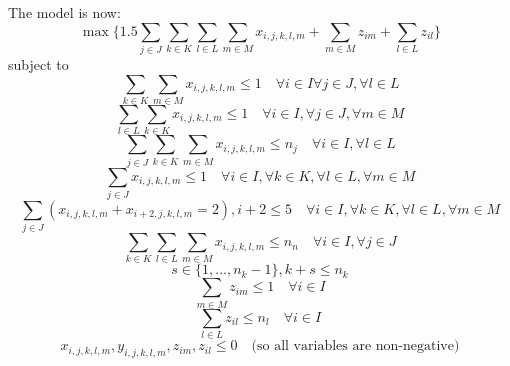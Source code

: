 The model is now:
\begin{equation*}
	\max \{1.5 \sum_{j \in J} \sum_{k \in K} \sum_{l \in L} \sum_{m \in M}
	x_{i,j,k,l,m} + \sum_{m \in M} z_{im} + \sum_{l \in L}z_{il} \}
\end{equation*}
subject to
\begin{equation*}
	\sum_{k \in K} \sum_{m \in M} x_{i,j,k,l,m} \leq 1 \quad \forall i \in I
	\forall j \in J, \forall l \in L
\end{equation*}
\begin{equation*}
	\sum_{l \in L} \sum_{k \in K} x_{i,j,k,l,m} \leq 1 \quad \forall i \in I,
	\forall j \in J, \forall m \in M
\end{equation*}
\begin{equation*}
	\sum_{j \in J} \sum_{k \in K} \sum_{m \in M} x_{i,j,k,l,m} \leq n_j \quad 
	\forall i \in I, \forall l \in L
\end{equation*}
\begin{equation*}
	\sum_{j \in J}x_{i,j,k,l,m} \leq 1 \quad \forall i \in I, \forall k \in K,
	\forall l \in L, \forall m \in M
\end{equation*}
\begin{equation*}
	\sum_{j \in J}(x_{i,j,k,l,m} + x_{i+2,j,k,l,m} = 2), i + 2 \leq 5 \quad
	\forall i \in I, \forall k \in K, \forall l \in L, \forall m \in M
\end{equation*}
\begin{equation*}
	\sum_{k \in K} \sum_{l \in L} \sum_{m \in M} x_{i,j,k,l,m} \leq n_n \quad
	\forall i \in I, \forall j \in J 
\end{equation*}
\begin{equation*}
	s \in \{1, \ldots, n_k - 1\}, k + s \leq n_k
\end{equation*}
\begin{equation*}
	\sum_{m \in M}z_{im} \leq 1 \quad \forall i \in I
\end{equation*}
\begin{equation*}
	\sum_{l \in L} z_{il} \leq n_l \quad \forall i \in I
\end{equation*}
\begin{equation*}
	x_{i,j,k,l,m}, y_{i,j,k,l,m}, z_{im}, z_{il} \leq 0 \quad \text{(so all
	variables are non-negative)}
\end{equation*}

